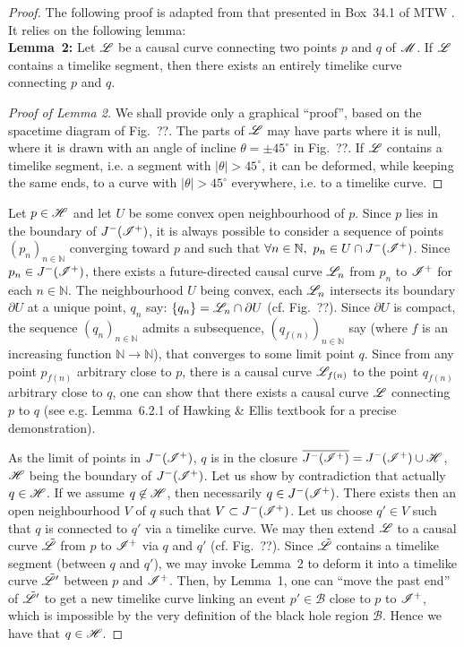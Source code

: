 \begin{proof}
The following proof is adapted from that presented in Box~34.1 of MTW \cite{MisneTW73}.
It relies on the following lemma:\\[1ex]
\textbf{Lemma~2:} Let $\mathscr{L}$ be a causal curve connecting two points $p$ and $q$
of $\mathscr{M}$. If $\mathscr{L}$ contains a timelike segment, then there exists an
entirely timelike curve connecting $p$ and $q$.
\begin{proof}[Proof of Lemma 2]
We shall provide only a graphical ``proof'', based on the spacetime diagram
of Fig.~??. The parts of $\mathscr{L}$ may have parts where it is null, where it is drawn with
an angle of incline $\theta = \pm 45^\circ$ in Fig.~??.
If $\mathscr{L}$ contains a timelike segment, i.e. a segment with $|\theta|>45^\circ$,
it can be deformed, while keeping the same ends, to a curve with $|\theta|>45^\circ$
everywhere, i.e. to a timelike curve.
\end{proof}

Let $p\in\mathscr{H}$ and let $U$ be some convex open neighbourhood of $p$.
Since $p$ lies in the boundary of $J^-(\mathscr{I}^+)$, it is always possible to
consider
a sequence of points $(p_n)_{n\in\mathbb{N}}$ converging toward $p$
and such that $\forall n\in\mathbb{N},\ p_n \in U \cap J^-(\mathscr{I}^+)$.
Since $p_n\in J^-(\mathscr{I}^+)$,
there exists a future-directed causal curve $\mathscr{L}_{n}$ from $p_n$ to $\mathscr{I}^+$
for each $n\in\mathbb{N}$.
The neighbourhood $U$ being convex, each $\mathscr{L}_n$ intersects its boundary $\partial U$
at a unique point, $q_n$ say: $\{q_n\}=\mathscr{L}_n \cap \partial U$ (cf. Fig.~??).
Since $\partial U$
is compact, the sequence $(q_n)_{n\in\mathbb{N}}$ admits a subsequence,
$(q_{f(n)})_{n\in\mathbb{N}}$ say (where $f$ is an increasing
function $\mathbb{N}\rightarrow\mathbb{N}$),
that converges to some limit point $q$.
Since from any point $p_{f(n)}$ arbitrary close to $p$, there is a causal curve
$\mathscr{L}_{f(n)}$ to the point $q_{f(n)}$ arbitrary close to $q$, one can show that
there exists a causal curve $\mathscr{L}$ connecting $p$ to $q$ (see e.g.
Lemma~6.2.1 of Hawking \& Ellis textbook \cite{HawkiE73}
for a precise demonstration).

As the limit of points in $J^-(\mathscr{I}^+)$, $q$ is in the closure
$\overline{J^-(\mathscr{I}^+)} = J^-(\mathscr{I}^+) \cup \mathscr{H}$, $\mathscr{H}$
being the boundary of $J^-(\mathscr{I}^+)$.
Let us show by contradiction that actually $q\in\mathscr{H}$.
If we assume $q\not\in\mathscr{H}$, then necessarily $q\in J^-(\mathscr{I}^+)$.
There exists then an open neighbourhood $V$ of $q$ such that $V \subset  J^-(\mathscr{I}^+)$.
Let us choose $q'\in V$ such that $q$ is connected to $q'$ via a timelike curve.
We may then extend $\mathscr{L}$ to a causal curve $\tilde{\mathscr{L}}$ from $p$ to $\mathscr{I}^+$
via $q$ and $q'$ (cf. Fig.~??). Since $\tilde{\mathscr{L}}$ contains a timelike segment
(between $q$ and $q'$), we may invoke Lemma~2 to deform it into
a timelike curve $\tilde{\mathscr{L}}'$ between $p$ and $\mathscr{I}^+$. Then, by Lemma~1,
one can ``move the past end'' of $\tilde{\mathscr{L}}'$
to get a new timelike curve linking an event $p'\in\mathscr{B}$ close
to $p$ to $\mathscr{I}^+$, which is impossible by the very definition of the black hole
region $\mathscr{B}$. Hence we have that $q\in\mathscr{H}$.


\end{proof}
